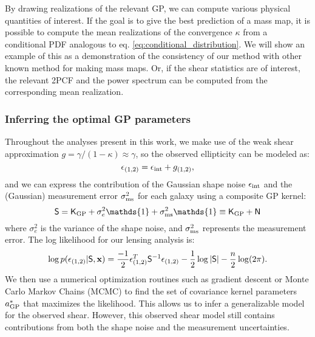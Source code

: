 By drawing realizations of the relevant GP, we can compute various 
physical quantities of interest. If the goal is to give the best prediction of a
mass map, it is possible to compute the mean realizations of the
convergence $\kappa$ from a conditional PDF
analogous to eq. \ref{eq:conditional_distribution}. 
We will show an example of this as a demonstration of
the consistency of our method with other known method for making mass maps.
Or, if the shear statistics are of interest, the relevant 2PCF and the power
spectrum can be computed from the corresponding mean realization.

\subsubsection{Inferring the optimal GP parameters}
\label{subsubsection:optimize_GP_params}
Throughout the analyses present in this work, 
we make use of the weak shear approximation 
$g = \gamma / (1 - \kappa)  \approx \gamma$, so the observed ellipticity can be
modeled as: 
\begin{equation}
	\epsilon_{(1, 2)} = \epsilon_{\rm int} + g_{(1, 2)}, 
	\label{eq:weak_shear_approx}
\end{equation}
and we can express the contribution of the Gaussian shape noise $\epsilon_{\rm int}$
and the (Gaussian) measurement error $\sigma_{\rm ms}^2$
for each galaxy using a composite GP kernel:
\begin{equation}
	\mathsf{S} = \kerngp_{\rm GP} + \sigma_e^2 \mathds{1}  + \sigma_{\rm ms}^2
	\mathds{1}
	\equiv \kerngp_{\rm GP} + \mathsf{N}
	\label{eq:composite_kernel}
\end{equation}
where $\sigma_e^2$ is the variance of the shape noise, and $\sigma_{\rm ms}^2$
represents the measurement error. 
The log likelihood for our lensing analysis is: 
\begin{equation}
	\log p(\epsilon_{(1,2)} | \mathsf{S}, \mathbf{x}) = \frac{-1}{2}\epsilon_{(1,2)}^T \mathsf{S}^{-1}
\epsilon_{(1, 2)}
- \frac{1}{2}\log|\mathsf{S}| - \frac{n}{2}\log(2\pi).
\label{eq:log_marginal_likelihood}
\end{equation}
We then use a numerical optimization routines such as gradient descent or 
Monte Carlo Markov Chains (MCMC)
to find the set of covariance kernel parameters $a_{\rm GP}^*$ that maximizes the
likelihood.
This allows us to infer a generalizable model for the observed shear. However,
this observed shear model still
contains contributions from both the shape noise and the measurement
uncertainties. 


